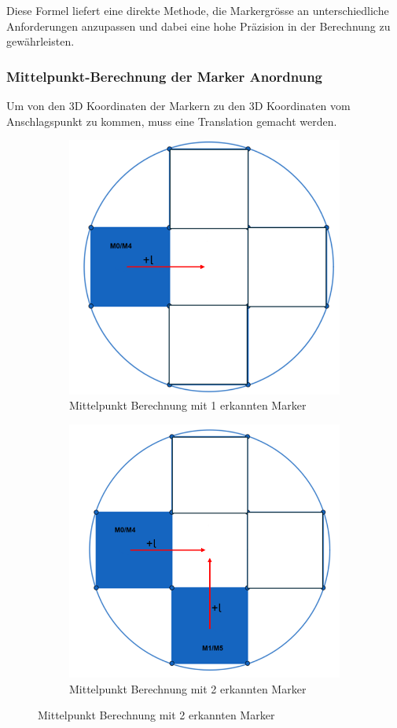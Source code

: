 Diese Formel liefert eine direkte Methode, die Markergrösse an unterschiedliche Anforderungen anzupassen und dabei eine hohe Präzision in der Berechnung zu gewährleisten.


\subsubsection{Mittelpunkt-Berechnung der Marker Anordnung}
\label{sec:middlePoint}

Um von den 3D Koordinaten der Markern zu den 3D Koordinaten vom Anschlagspunkt zu kommen, muss eine Translation 
gemacht werden.

\begin{figure}[H]
    \centering
    \begin{subfigure}[h]{0.5\textwidth}
      \centering
        \includegraphics[width=0.5\linewidth]{graphics/anordnung_marker_1.png}
        \caption{Mittelpunkt Berechnung mit 1 erkannten Marker}
        \label{fig:marker_anordnung1}
    \end{subfigure}
    \begin{subfigure}[h]{0.5\textwidth}
      \centering
        \includegraphics[width=0.5\linewidth]{graphics/anordnung_marker_2.png}
        \caption{Mittelpunkt Berechnung mit 2 erkannten Marker}
        \label{fig:marker_anordnung2}
    \end{subfigure}

\end{figure}
